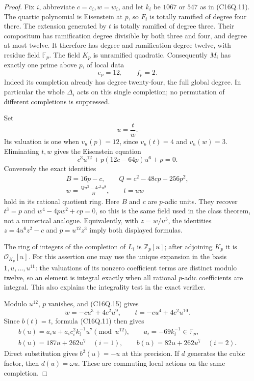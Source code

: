 \begin{proof}
Fix $i$, abbreviate $c=c_i,w=w_i$, and let $k_i$ be $1067$ or $547$
as in (C16Q.11).
The quartic polynomial is Eisenstein at $p$, so $F_i$ is totally
ramified of degree four there.
The extension generated by $t$ is totally ramified of degree three.
Their compositum has ramification degree divisible by both three
and four, and degree at most twelve.
It therefore has degree and ramification degree twelve, with
residue field $\mathbb F_p$.
The field $K_p$ is unramified quadratic.
Consequently $M_i$ has exactly one prime above $p$, of local data
\[
                         e_p=12,\qquad f_p=2.
 \tag{C16Q.12}
\]
Indeed its completion already has degree twenty-four, the full
global degree.  In particular the whole $\Delta_i$ acts on this
single completion; no permutation of different completions is suppressed.

Set
\[
                         u=\frac tw.
 \tag{C16Q.13}
\]
Its valuation is one when $v_u(p)=12$, since $v_u(t)=4$ and
$v_u(w)=3$.
Eliminating $t,w$ gives the Eisenstein equation
\[
                  c^3u^{12}+p(12c-64p)u^6+p=0.
 \tag{C16Q.14}
\]
Conversely the exact identities
\[
 \begin{gathered}
 B=16p-c,\qquad Q=c^2-48cp+256p^2,\\
 w=\frac{Q u^3-4c^3u^9}{B},\qquad t=u w
 \end{gathered}
 \tag{C16Q.15}
\]
hold in its rational quotient ring.
Here $B$ and $c$ are $p$-adic units.
They recover $t^3=p$ and $w^4-4p w^2+cp=0$, so this is
the same field used in the class theorem, not a numerical analogue.
Equivalently, with $z=w/u^3$, the identities
$z=4u^6z^2-c$ and $p=u^{12}z^3$ imply both displayed formulas.

The ring of integers of the completion of $L_i$ is
$\mathbb Z_p[u]$; after adjoining $K_p$ it is
$\mathcal O_{K_p}[u]$.
For this assertion one may use the unique expansion in the basis
$1,u,\ldots,u^{11}$: the valuations of its nonzero coefficient
terms are distinct modulo twelve, so an element is integral
exactly when all rational $p$-adic coefficients are integral.
This also explains the integrality test in the exact verifier.

Modulo $u^{12}$, $p$ vanishes, and (C16Q.15) gives
\[
             w=-c u^3+4c^2u^9,\qquad
             t=-c u^4+4c^2u^{10}.
 \tag{C16Q.16}
\]
Since $b(t)=t$, formula (C16Q.11) then gives
\[
 \begin{gathered}
 b(u)=a_i u+a_i c_i^2 k_i^{-1}u^7\pmod{u^{12}},
             \qquad a_i=-69k_i^{-1}\in\mathbb F_p,\\
 b(u)=187u+262u^7\quad(i=1),\qquad
 b(u)=82u+262u^7\quad(i=2).
 \end{gathered}
 \tag{C16Q.17}
\]
Direct substitution gives $b^2(u)=-u$ at this precision.
If $d$ generates the cubic factor, then $d(u)=\omega u$.
These are commuting local actions on the same completion.


\end{proof}

